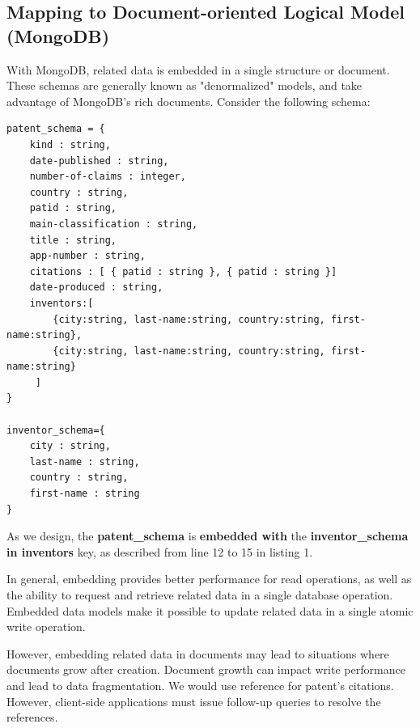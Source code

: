 \documentclass{article}
\begin{document}
\subsection{Mapping to Document-oriented Logical Model (MongoDB)}
With MongoDB, related data is embedded in a single structure or document. These schemas are generally known as "denormalized" models, and take advantage of MongoDB's rich documents. Consider the following schema:
\begin{lstlisting}[caption=Document-oriented schema]
patent_schema = {
    kind : string, 
    date-published : string, 
    number-of-claims : integer, 
    country : string, 
    patid : string,
    main-classification : string,
    title : string,
    app-number : string, 
    citations : [ { patid : string }, { patid : string }]
    date-produced : string, 
    inventors:[
    	{city:string, last-name:string, country:string, first-name:string},
    	{city:string, last-name:string, country:string, first-name:string}
     ]       
}

inventor_schema={
    city : string, 
    last-name : string, 
    country : string, 
    first-name : string
}
\end{lstlisting}

As we design, the \textbf{patent\_schema} is \textbf{embedded with} the \textbf{inventor\_schema in inventors} key, as described from line 12 to 15 in listing 1.\par
In general, embedding provides better performance for read operations, as well as the ability to request and retrieve related data in a single database operation. Embedded data models make it possible to update related data in a single atomic write operation.\par
However, embedding related data in documents may lead to situations where documents grow after creation. Document growth can impact write performance and lead to data fragmentation. We would use reference for patent's citations. However, client-side applications must issue follow-up queries to resolve the references.

\end{document}
